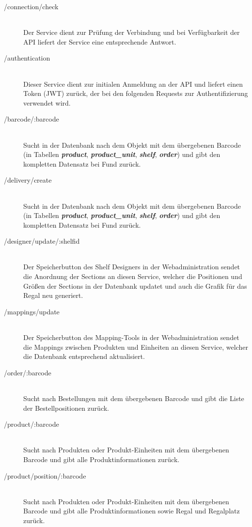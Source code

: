 \begin{description}
  \item[/connection/check] \hfill \\
    Der Service dient zur Prüfung der Verbindung und bei Verfügbarkeit der API liefert der Service eine entsprechende Antwort.
  \item[/authentication] \hfill \\
    Dieser Service dient zur initialen Anmeldung an der \acs{API} und liefert einen Token (\acs{JWT}) zurück, der bei den folgenden Requests zur Authentifizierung verwendet wird.
  \item[/barcode/:barcode] \hfill \\
    Sucht in der Datenbank nach dem Objekt mit dem übergebenen Barcode (in Tabellen \textit{\textbf{product}}, \textit{\textbf{product\_unit}}, \textit{\textbf{shelf}}, \textit{\textbf{order}}) und gibt den kompletten Datensatz bei Fund zurück.
  \item[/delivery/create] \hfill \\
    Sucht in der Datenbank nach dem Objekt mit dem übergebenen Barcode (in Tabellen \textit{\textbf{product}}, \textit{\textbf{product\_unit}}, \textit{\textbf{shelf}}, \textit{\textbf{order}}) und gibt den kompletten Datensatz bei Fund zurück.
  \item[/designer/update/:shelfid] \hfill \\
    Der Speicherbutton des Shelf Designers in der Webadministration sendet die Anordnung der Sections an diesen Service, welcher die Positionen und Größen der Sections in der Datenbank updatet und auch die Grafik für das Regal neu generiert.
  \item[/mappings/update] \hfill \\
    Der Speicherbutton des Mapping-Tools in der Webadministration sendet die Mappings zwischen Produkten und Einheiten an diesen Service, welcher die Datenbank entsprechend aktualisiert.
  \item[/order/:barcode] \hfill \\
    Sucht nach Bestellungen mit dem übergebenen Barcode und gibt die Liste der Bestellpositionen zurück.
  \item[/product/:barcode] \hfill \\
    Sucht nach Produkten oder Produkt-Einheiten mit dem übergebenen Barcode und gibt alle Produktinformationen zurück.
  \item[/product/position/:barcode] \hfill \\
    Sucht nach Produkten oder Produkt-Einheiten mit dem übergebenen Barcode und gibt alle Produktinformationen sowie Regal und Regalplatz zurück.

\end{description}
